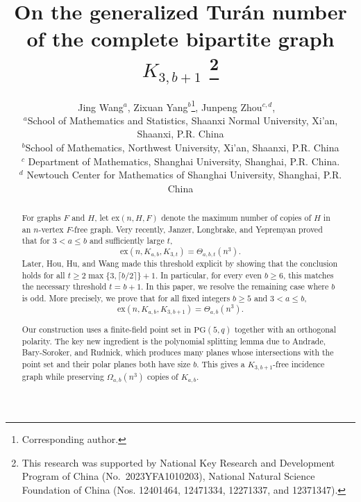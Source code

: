 \documentclass[11pt,a4paper]{article}
\theoremstyle{definition}
\theoremstyle{remark}
\begin{document}
\title{On the generalized Tur\'{a}n number of the complete bipartite graph $K_{3,b+1}$ \thanks{This research was supported by National Key Research and Development Program of China (No.~2023YFA1010203), National Natural Science Foundation of China (Nos. 12401464, 12471334, 12271337, and 12371347).}
}


\date{}


\author{Jing Wang$^{a}$,   Zixuan Yang$^{b}$\thanks{Corresponding author.}, Junpeng Zhou$^{c,d}$,
~\\[3mm]
\small $^{a}$School of Mathematics and Statistics,  Shaanxi Normal University, Xi'an, Shaanxi, P.R. China\\
\small $^{b}$School of Mathematics,  Northwest University, Xi'an, Shaanxi, P.R. China\\
\small $^{c}$ Department of Mathematics, Shanghai University, Shanghai, P.R. China.\\
\small$^{d}$ Newtouch Center for Mathematics of Shanghai University, Shanghai, P.R. China
}
\maketitle

\begin{abstract}
For graphs $F$ and $H$, let $\mathrm{ex}(n,H,F)$ denote the maximum number of copies of $H$ in an $n$-vertex $F$-free graph. Very recently,  Janzer, Longbrake, and Yepremyan proved that for $3<a\leq b$ and sufficiently large $t$,
\begin{equation*}
\mathrm{ex}(n,K_{a,b},K_{3,t})=\Theta_{a,b,t}(n^3).
\end{equation*}
Later, Hou, Hu, and Wang made this threshold explicit by showing that the conclusion holds for all $t\geq 2\max\{3,\lceil b/2\rceil\}+1$. In particular, for every even $b\geq 6$, this matches the necessary threshold $t=b+1$. 
In this paper, we resolve the remaining case where $b$ is odd. More precisely, we prove that for all fixed integers $b\geq 5$ and $3<a\leq b$,
\begin{equation*}
\mathrm{ex}(n,K_{a,b},K_{3,b+1})=\Theta_{a,b}(n^3).
\end{equation*}


Our construction uses a finite-field point set in $\mathrm{PG}(5,q)$ together with an orthogonal polarity. The key new ingredient is the polynomial splitting lemma due to Andrade, Bary-Soroker, and Rudnick, which produces many planes whose intersections with the point set and their polar planes both have size $b$. This gives a $K_{3,b+1}$-free
incidence graph while preserving $\Omega_{a,b}(n^3)$ copies of $K_{a,b}$.
\end{abstract}
\end{document}
